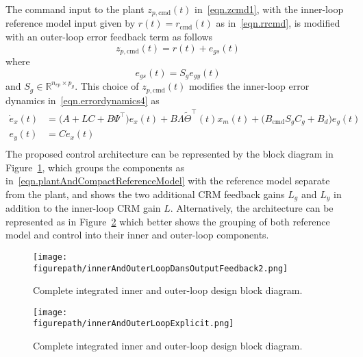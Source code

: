 The command input to the plant $z_{p,\text{cmd}}(t)$ in\ \eqref{eqn.zcmd1}, with the inner-loop reference model input given by $r(t)=r_{\text{cmd}}(t)$ as in\ \eqref{eqn.rrcmd}, is modified with an outer-loop error feedback term as follows
\begin{equation}
  \label{eqn.zpcmd}
  z_{p,\text{cmd}}(t) = r (t)+ e_{gs}(t)
\end{equation}
where
\begin{equation}
  \label{eqn.egs}
  e_{gs}(t) = S_{g}e_{gy}(t)
\end{equation}
and $S_{g}\in\mathbb{R}^{n_{ep}\times p_{g}}$.
This choice of $z_{p,\text{cmd}}(t)$ modifies the inner-loop error dynamics in\ \eqref{eqn.errordynamics4} as
\begin{equation}
  \label{eqn.errordynamics5}
  \begin{split}
    \dot{e}_{x}(t)
    &=
    \bigr(A+LC+B\Psi^{\top}\bigr)e_{x}(t) + B\Lambda\widetilde{\Theta}^{\top}(t)x_{m}(t) + \bigr(B_{\text{cmd}}S_{g}C_{g} + B_{d}\bigr)e_{g}(t) \\
    e_{y}(t)
    &=
    Ce_{x}(t) \\
  \end{split}
\end{equation}
The proposed control architecture can be represented by the block diagram in Figure~\ref{fig.innerAndOuterLoopDansOutputFeedback}, which groups the components as in\ \eqref{eqn.plantAndCompactReferenceModel} with the reference model separate from the plant, and shows the two additional CRM feedback gains $L_{g}$ and $L_{y}$ in addition to the inner-loop CRM gain $L$.
Alternatively, the architecture can be represented as in Figure~\ref{fig.innerAndOuterLoopExplicit} which better shows the grouping of both reference model and control into their inner and outer-loop components.

\begin{figure}[H]
  \begin{center}
    \texttt{[image: \\figurepath/innerAndOuterLoopDansOutputFeedback2.png]}
    \vspace{-0.1in}
    \caption{Complete integrated inner and outer-loop design block diagram.\label{fig.innerAndOuterLoopDansOutputFeedback}}
  \end{center}
\end{figure}

\begin{figure}[H]
  \begin{center}
    \texttt{[image: \\figurepath/innerAndOuterLoopExplicit.png]}
    \vspace{-0.1in}
    \caption{Complete integrated inner and outer-loop design block diagram.\label{fig.innerAndOuterLoopExplicit}}
  \end{center}
\end{figure}

